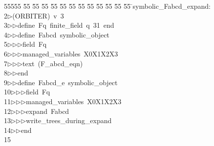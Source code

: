 %
%
\begin{tabbing}
55555 \= 55 \= 55 \= 55 \= 55 \= 55 \= 55 \= 55 \= 55 \= 55 \= 55 \= 55 \= 55 \= \>symbolic\_Fabcd\_expand:\\[0pt]
2\>$\triangleright$\>(ORBITER)\ v\ 3\ \\[0pt]
3\>$\triangleright$\>$\triangleright$\>define\ Fq\ finite\_field\ q\ 31\ end\ \\[0pt]
4\>$\triangleright$\>$\triangleright$\>define\ Fabcd\ symbolic\_object\ \\[0pt]
5\>$\triangleright$\>$\triangleright$\>$\triangleright$\>field\ Fq\ \\[0pt]
6\>$\triangleright$\>$\triangleright$\>$\triangleright$\>managed\_variables\ X0X1X2X3\ \\[0pt]
7\>$\triangleright$\>$\triangleright$\>$\triangleright$\>text\ (F\_abcd\_eqn)\ \\[0pt]
8\>$\triangleright$\>$\triangleright$\>end\ \\[0pt]
9\>$\triangleright$\>$\triangleright$\>define\ Fabcd\_e\ symbolic\_object\ \\[0pt]
10\>$\triangleright$\>$\triangleright$\>$\triangleright$\>field\ Fq\ \\[0pt]
11\>$\triangleright$\>$\triangleright$\>$\triangleright$\>managed\_variables\ X0X1X2X3\ \\[0pt]
12\>$\triangleright$\>$\triangleright$\>$\triangleright$\>expand\ Fabcd\ \\[0pt]
13\>$\triangleright$\>$\triangleright$\>$\triangleright$\>write\_trees\_during\_expand\ \\[0pt]
14\>$\triangleright$\>$\triangleright$\>end\\[0pt]
15\>\end{tabbing}
